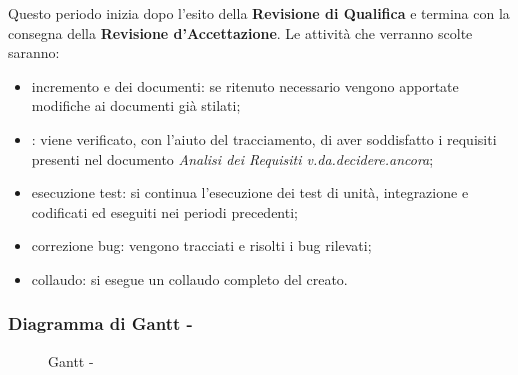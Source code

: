 \documentclass[./PianoDiProgetto.tex]{subfiles}
\begin{document}
  Questo periodo inizia dopo l'esito della \textbf{Revisione di Qualifica} e termina con la consegna della \textbf{Revisione d'Accettazione}. Le attività che verranno scolte saranno:
  \begin{itemize}
    \item incremento e  dei documenti: se ritenuto necessario vengono apportate modifiche ai documenti già stilati;
    \item {}: viene verificato, con l'aiuto del tracciamento, di aver soddisfatto i requisiti presenti nel documento \textit{Analisi dei Requisiti v.da.decidere.ancora};
    \item esecuzione test: si continua l'esecuzione dei test di unità, integrazione e  codificati ed eseguiti nei periodi precedenti;
    \item correzione bug: vengono tracciati e risolti i bug rilevati;
    \item collaudo: si esegue un collaudo completo del  creato.
  \end{itemize}

  \subsubsection{Diagramma di Gantt - \PerV}
    \begin{figure}[!h]
    \centering
    \caption{Gantt - \PerV}
    \end{figure}
\end{document}
